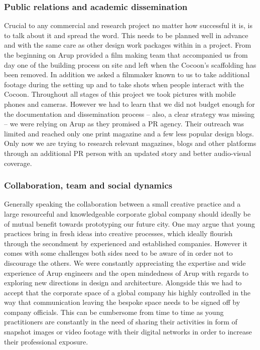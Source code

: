 \subsubsection*{Public relations and academic dissemination} 

Crucial to any commercial and research project no matter how successful it is, is to talk about it and spread the word. This needs to be planned well in advance and with the same care as other design work packages within in a project.   
From the beginning on Arup provided a film making team that accompanied us from day one of the building process on site and left when the Cocoon’s scaffolding has been removed. In addition we asked a filmmaker known to us to take additional footage during the setting up and to take shots when people interact with the Cocoon. Throughout all stages of this project we took pictures with mobile phones and cameras.
However we had to learn that we did not budget enough for the documentation and dissemination process – also, a clear strategy was missing – we were relying on Arup as they promised a PR agency. Their outreach was limited and reached only one print magazine and a few less popular design blogs. Only now we are trying to research relevant magazines, blogs and other platforms through an additional PR person with an updated story and better audio-visual coverage.

\subsubsection*{Collaboration, team and social dynamics}

Generally speaking the collaboration between a small creative practice and a large resourceful and knowledgeable corporate global company should ideally be of mutual benefit towards prototyping our future city. One may argue that young practices bring in fresh ideas into creative processes, which ideally flourish through the secondment by experienced and established companies. However it comes with some challenges both sides need to be aware of in order not to discourage the others. We were constantly appreciating the expertise and wide experience of Arup engineers and the open mindedness of Arup with regards to exploring new directions in design and architecture. Alongside this we had to accept that the corporate space of a global company his highly controlled in the way that communication leaving the bespoke space needs to be signed off by company officials. This can be cumbersome from time to time as young practitioners are constantly in the need of sharing their activities in form of snapshot images or video footage with their digital networks in order to increase their professional exposure.   


